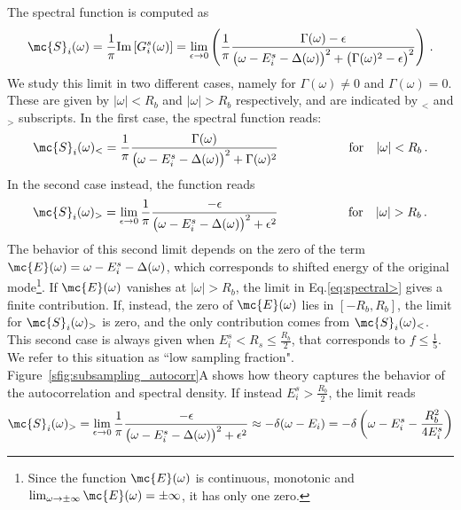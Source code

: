The spectral function is computed as
\begin{equation}
    \mc{S}_i(\omega) =
    \frac{1}{\pi}\text{Im}\left[ G^s_i(\omega) \right] =
    \lim_{\epsilon\to 0} \left(
    \frac{1}{\pi}\frac{\Gamma(\omega)-\epsilon}{\big(\omega-E^s_i - \Delta(\omega)\big)^2 + \big(\Gamma(\omega)^2-\epsilon\big)^2}  \right) \,.
    \label{eq:spectralfunction_limit}
\end{equation}
We study this limit in two different cases, namely for
$\Gamma(\omega)\neq 0$ and $\Gamma(\omega) = 0$. These are given by $\left|\omega\right|<R_b$ and $\left|\omega\right|>R_b$ respectively, and are indicated by $_<$ and $_>$ subscripts.
In the first case, the spectral function reads:
\begin{equation}
    \mc{S}_i(\omega)_< =
    \frac{1}{\pi}\frac{\Gamma(\omega)}{\big(\omega-E^s_i - \Delta(\omega)\big)^2 + \Gamma(\omega)^2}
    \hspace{2cm} \text{for} \hspace{0.3cm} \left|\omega\right|<R_b \,.
    \label{eq:spectral<}
\end{equation}
In the second case instead,
the function reads
\begin{equation}
    \mc{S}_i(\omega)_> =
    \lim_{\epsilon\to0}
    \frac{1}{\pi}\frac{-\epsilon}{\big(\omega-E^s_i - \Delta(\omega)\big)^2 + \epsilon^2}
    \hspace{2cm} \text{for} \hspace{0.3cm} \left|\omega\right|>R_b \,.
    \label{eq:spectral>}
\end{equation}
The behavior of this second limit depends on the zero of the term $\mc{E}(\omega) = \omega - E^s_i - \Delta(\omega)$, which corresponds to shifted energy of the original mode\footnote{Since the function $\mc{E}(\omega)$ is continuous, monotonic and $
\lim_{\omega\to\pm\infty}\mc{E}(\omega) = \pm\infty$, it has only one zero.}.
If $\mc{E}(\omega)$ vanishes at $\left|\omega\right|>R_b$, the limit in Eq.\ref{eq:spectral>} gives a finite contribution. If, instead, the zero of $\mc{E}(\omega)$ lies in $[-R_b, R_b]$, the limit for $\mc{S}_i(\omega)_>$ is zero, and the only contribution comes from $\mc{S}_i(\omega)_<$.
This second case is always given when $E_i^s<R_s\leq \frac{R_b}{2}$, that corresponds to $f \leq \frac{1}{5}$. We refer to this situation as ``low sampling fraction".
Figure~\ref{sfig:subsampling_autocorr}A shows how theory captures the behavior of the autocorrelation and spectral density.
If instead $E_i^s>\frac{R_b}{2}$, the limit reads
\begin{equation}
    \mc{S}_i(\omega)_> =
    \lim_{\epsilon\to0}
    \frac{1}{\pi}\frac{-\epsilon}{\big(\omega-E^s_i - \Delta(\omega)\big)^2 + \epsilon^2}
    \approx
    -\delta(\omega-E_i) = -\delta\left(\omega-E_i^s-\frac{R_b^2}{4E_i^s}\right)
\end{equation}

